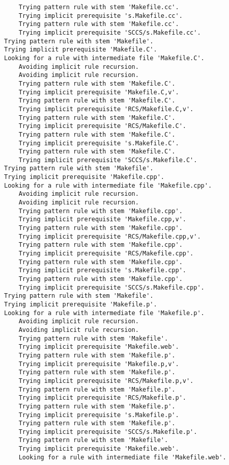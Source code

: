 \documentclass[11pt]{article}
\begin{document}
\begin{enumerate}
\begin{enumerate}
\begin{verbatim}
    Trying pattern rule with stem 'Makefile.cc'.
    Trying implicit prerequisite 's.Makefile.cc'.
    Trying pattern rule with stem 'Makefile.cc'.
    Trying implicit prerequisite 'SCCS/s.Makefile.cc'.
Trying pattern rule with stem 'Makefile'.
Trying implicit prerequisite 'Makefile.C'.
Looking for a rule with intermediate file 'Makefile.C'.
    Avoiding implicit rule recursion.
    Avoiding implicit rule recursion.
    Trying pattern rule with stem 'Makefile.C'.
    Trying implicit prerequisite 'Makefile.C,v'.
    Trying pattern rule with stem 'Makefile.C'.
    Trying implicit prerequisite 'RCS/Makefile.C,v'.
    Trying pattern rule with stem 'Makefile.C'.
    Trying implicit prerequisite 'RCS/Makefile.C'.
    Trying pattern rule with stem 'Makefile.C'.
    Trying implicit prerequisite 's.Makefile.C'.
    Trying pattern rule with stem 'Makefile.C'.
    Trying implicit prerequisite 'SCCS/s.Makefile.C'.
Trying pattern rule with stem 'Makefile'.
Trying implicit prerequisite 'Makefile.cpp'.
Looking for a rule with intermediate file 'Makefile.cpp'.
    Avoiding implicit rule recursion.
    Avoiding implicit rule recursion.
    Trying pattern rule with stem 'Makefile.cpp'.
    Trying implicit prerequisite 'Makefile.cpp,v'.
    Trying pattern rule with stem 'Makefile.cpp'.
    Trying implicit prerequisite 'RCS/Makefile.cpp,v'.
    Trying pattern rule with stem 'Makefile.cpp'.
    Trying implicit prerequisite 'RCS/Makefile.cpp'.
    Trying pattern rule with stem 'Makefile.cpp'.
    Trying implicit prerequisite 's.Makefile.cpp'.
    Trying pattern rule with stem 'Makefile.cpp'.
    Trying implicit prerequisite 'SCCS/s.Makefile.cpp'.
Trying pattern rule with stem 'Makefile'.
Trying implicit prerequisite 'Makefile.p'.
Looking for a rule with intermediate file 'Makefile.p'.
    Avoiding implicit rule recursion.
    Avoiding implicit rule recursion.
    Trying pattern rule with stem 'Makefile'.
    Trying implicit prerequisite 'Makefile.web'.
    Trying pattern rule with stem 'Makefile.p'.
    Trying implicit prerequisite 'Makefile.p,v'.
    Trying pattern rule with stem 'Makefile.p'.
    Trying implicit prerequisite 'RCS/Makefile.p,v'.
    Trying pattern rule with stem 'Makefile.p'.
    Trying implicit prerequisite 'RCS/Makefile.p'.
    Trying pattern rule with stem 'Makefile.p'.
    Trying implicit prerequisite 's.Makefile.p'.
    Trying pattern rule with stem 'Makefile.p'.
    Trying implicit prerequisite 'SCCS/s.Makefile.p'.
    Trying pattern rule with stem 'Makefile'.
    Trying implicit prerequisite 'Makefile.web'.
    Looking for a rule with intermediate file 'Makefile.web'.

\end{verbatim}
\end{enumerate}
\end{enumerate}
\end{document}
